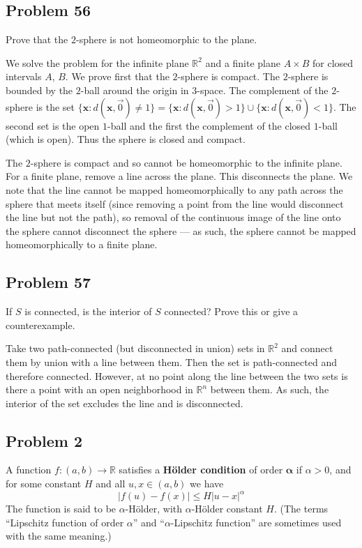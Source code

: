 \documentclass{amsart}
\begin{document}
\newpage
\subsection*{Problem 56} Prove that the $2$-sphere is not homeomorphic to the plane.

\medskip

\noindent We solve the problem for the infinite plane $\mathbb{R}^2$ and a finite plane $A\times B$
for closed intervals $A$, $B$. We prove first that the $2$-sphere is compact. The $2$-sphere is bounded
by the $2$-ball around the origin in $3$-space. The complement of the $2$-sphere is the set
$\{\mathbf{x}: d(\mathbf{x}, \vec{0})\neq 1\}= \{\mathbf{x}: d(\mathbf{x}, \vec{0})> 1\}\cup \{\mathbf{x}: d(\mathbf{x}, \vec{0}) < 1\}$. The 
second set is the open $1$-ball and the first the complement of the closed $1$-ball (which is open). Thus the sphere is closed and compact.

\medskip \noindent The $2$-sphere is compact and so cannot be homeomorphic to the infinite plane.
For a finite plane, remove a line across the plane. This disconnects the plane. We note that the line cannot be
mapped homeomorphically to any path across the sphere that meets itself (since removing a point from the line would 
disconnect the line but not the path), so removal of the continuous image of the line onto the sphere cannot
disconnect the sphere — as such, the sphere cannot be mapped homeomorphically to a finite plane.


\newpage
\subsection*{Problem 57} If $S$ is connected, is the interior of $S$ connected? Prove this or give a counterexample.

\medskip

\noindent Take two path-connected (but disconnected in union) sets in $\mathbb{R}^2$ and connect them by union with a line 
between them. Then the set is path-connected and therefore connected. However, at no point along the line between the two 
sets is there a point with an open neighborhood in $\mathbb{R}^n$ between them. As such, the interior of the set excludes the
line and is disconnected.


\newpage
\subsection*{Problem 2} A function $f: (a,b) \rightarrow \mathbb{R}$ satisfies a \textbf{H\"{o}lder condition} of order
$\boldsymbol{\alpha}$ if $\alpha > 0$, and for some constant $H$ and all $u, x \in (a, b)$ we have
$$|f(u) - f(x)| \leq H|u - x|^{\alpha}$$
The function is said to be $\alpha$-H\"{o}lder, with $\alpha$-H\"{o}lder constant $H$. (The terms “Lipschitz function of order $\alpha$” and “$\alpha$-Lipschitz function” 
are sometimes used with the same meaning.)
\end{document}
